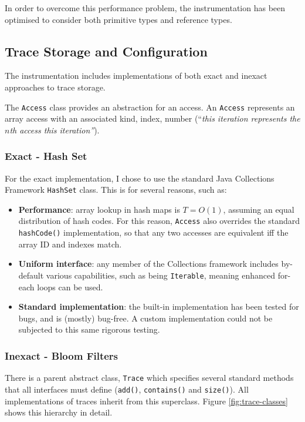 		In order to overcome this performance problem, the instrumentation has been optimised to consider both primitive types and reference types.
	
	\subsection{Trace Storage and Configuration} \label{sec:runtime/implementation/trace}
	The instrumentation includes implementations of both exact and inexact approaches to trace storage.
	
	The \texttt{Access} class provides an abstraction for an access. An \texttt{Access} represents an array access with an associated kind, index, number (``\textit{this iteration represents the $n$th access this iteration''}).
	
		\subsubsection{Exact - Hash Set} \label{sec:runtime/implementation/trace/hashset}
		For the exact implementation, I chose to use the standard Java Collections Framework \texttt{HashSet} class. This is for several reasons, such as:
		
		\begin{itemize}
			\item \textbf{Performance}: array lookup in hash maps is $T=O(1)$, assuming an equal distribution of hash codes. For this reason, \texttt{Access} also overrides the standard \texttt{hashCode()} implementation, so that any two accesses are equivalent iff the array ID and indexes match.
			
			\item \textbf{Uniform interface}: any member of the Collections framework includes by-default various capabilities, such as being \texttt{Iterable}, meaning enhanced for-each loops can be used.
			
			\item \textbf{Standard implementation}: the built-in implementation has been tested for bugs, and is (mostly) bug-free. A custom implementation could not be subjected to this same rigorous testing.
		\end{itemize}
		
		\subsubsection{Inexact - Bloom Filters} 
		There is a parent abstract class, \texttt{Trace} which specifies several standard methods that all interfaces must define (\texttt{add()}, \texttt{contains()} and \texttt{size()}). All implementations of traces inherit from this superclass. Figure \ref{fig:trace-classes} shows this hierarchy in detail.
		
